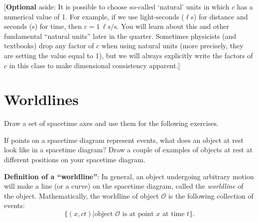 \documentclass[11pt, letterpaper, openany]{book}
\newenvironment{exercise}[1][Exercise]{%
  \tcolorbox[blanker, breakable, left=1em,
    before skip=1em, after skip=1em,
    borderline west={3pt}{0pt}{PhysNavy},
    colback=PhysCream,
    before upper={\textcolor{PhysNavy}{\sffamily\bfseries #1:}\space}
  ]%
}{%
  \endtcolorbox%
}
\begin{document}
[\textbf{Optional} aside: It is possible to choose so-called `natural' units in which $c$ has a numerical value of 1. For example, if we use light-seconds ($\ell$s) for distance and seconds (s) for time, then $c = 1 \, \ell\text{s/s}$. You will learn about this and other fundamental ``natural units'' later in the quarter. Sometimes physicists (and textbooks) drop any factor of $c$ when using natural units (more precisely, they are setting the value equal to 1), but we will always explicitly write the factors of $c$ in this class to make dimensional consistency apparent.]

\section{Worldlines}

Draw a set of spacetime axes and use them for the following exercises.

\begin{exercise}[Exercise 2]
If points on a spacetime diagram represent events, what does an object at rest look like in a spacetime diagram? Draw a couple of examples of objects at rest at different positions on your spacetime diagram.
\end{exercise}

\begin{center}
\end{center}

\textbf{Definition of a ``worldline''}: In general, an object undergoing arbitrary motion will make a line (or a curve) on the spacetime diagram, called the \textit{worldline} of the object. Mathematically, the worldline of object $\mathcal{O}$ is the following collection of events:
\[ \{ (x, ct) | \text{object } \mathcal{O} \text{ is at point } x \text{ at time } t \}. \]
\end{document}
